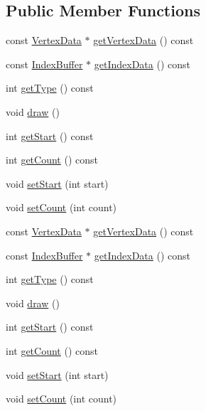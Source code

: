 \subsection*{Public Member Functions}
\begin{DoxyCompactItemize}
\item 
const \hyperlink{classVertexData}{Vertex\+Data} $\ast$ \hyperlink{classPrimitive_a693a1a18b0378850950240ee43249f36}{get\+Vertex\+Data} () const
\item 
const \hyperlink{classIndexBuffer}{Index\+Buffer} $\ast$ \hyperlink{classPrimitive_a7f0e018ab541640762d23f6a657d9bda}{get\+Index\+Data} () const
\item 
int \hyperlink{classPrimitive_ac2080c271a744f9967849ac9c50ac232}{get\+Type} () const
\item 
void \hyperlink{classPrimitive_a05c1e57fa8e47845c921cd4ec641d803}{draw} ()
\item 
int \hyperlink{classPrimitive_a0736b5ae5e828886f073508674956df2}{get\+Start} () const
\item 
int \hyperlink{classPrimitive_afa0bf0c4ad511ce349b3018164f040ee}{get\+Count} () const
\item 
void \hyperlink{classPrimitive_a0d86c220ce189f2e70e40bf75a29b964}{set\+Start} (int start)
\item 
void \hyperlink{classPrimitive_acf3d34a3828a3f4cb97779ac852121a6}{set\+Count} (int count)
\item 
const \hyperlink{classVertexData}{Vertex\+Data} $\ast$ \hyperlink{classPrimitive_ad530735df14ec8c9a04f4d3832e6535d}{get\+Vertex\+Data} () const
\item 
const \hyperlink{classIndexBuffer}{Index\+Buffer} $\ast$ \hyperlink{classPrimitive_a81f76d64283ee3314e27cc34a4a4acd8}{get\+Index\+Data} () const
\item 
int \hyperlink{classPrimitive_ac2080c271a744f9967849ac9c50ac232}{get\+Type} () const
\item 
void \hyperlink{classPrimitive_a05c1e57fa8e47845c921cd4ec641d803}{draw} ()
\item 
int \hyperlink{classPrimitive_a0736b5ae5e828886f073508674956df2}{get\+Start} () const
\item 
int \hyperlink{classPrimitive_afa0bf0c4ad511ce349b3018164f040ee}{get\+Count} () const
\item 
void \hyperlink{classPrimitive_a0d86c220ce189f2e70e40bf75a29b964}{set\+Start} (int start)
\item 
void \hyperlink{classPrimitive_acf3d34a3828a3f4cb97779ac852121a6}{set\+Count} (int count)
\end{DoxyCompactItemize}

